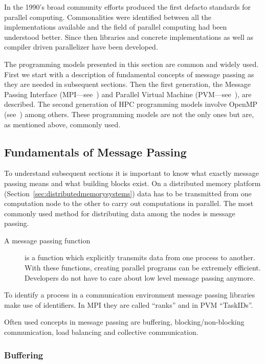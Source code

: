 In the 1990's broad community efforts produced the first defacto
standards for parallel computing. Commonalities were identified
between all the implementations available and the field of parallel
computing had been understood better. Since then libraries and concrete
implementations as well as compiler driven parallelizer have been
developed.


The programming models presented in this section are common and widely
used. First we start with a description of fundamental concepts of
message passing as they are needed in subsequent sections. Then the
first generation, the Message Passing Interface 
(MPI---see~\cite{forum94:MPI}) and Parallel Virtual Machine
(PVM---see~\cite{geist94pvm}),
are described. The second generation of HPC programming
models involve OpenMP (see~\cite{openMP05}) among others. These
programming models are not the only ones 
but are, as mentioned above, commonly used. 

\subsection{Fundamentals of Message Passing}
\label{sec:messagepassing}

To understand subsequent sections it is important to know what exactly
message passing means and what building blocks exist.
On a distributed memory platform
(Section~\ref{sec:distributedmemorysystems}) data has to be transmitted
from one computation node to the other to carry out computations in
parallel. The most commonly used method for distributing data among
the nodes is message passing.
  
\begin{description}
\item[A message passing function] is a function which explicitly transmits
  data from one process to another. With these
  functions, creating parallel programs can be extremely
  efficient. Developers do not have to care about low level
  message passing anymore.
\end{description}

To identify a process in a communication environment message passing
libraries make use of identifiers. In MPI they are called ``ranks''
and in PVM ``TaskIDs''.

Often used concepts in message passing are buffering,
blocking/non-blocking communication, load balancing and collective
communication. 

\subsubsection{Buffering}

